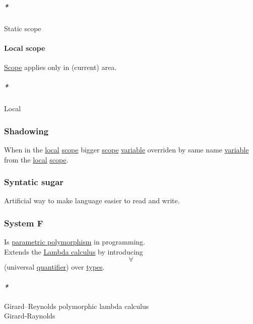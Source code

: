 \documentclass[11pt]{article}
\begin{document}
\subparagraph{\emph{*}}
\label{sec:org0f3cca0}

\label{orgd10a8be}Static scope\\

\paragraph{\label{org4480acc}Local scope}
\label{sec:org4bb45eb}
\hyperref[orgb3c0d1a]{Scope} applies only in (current) area.\\

\subparagraph{\emph{*}}
\label{sec:org19e1e8d}

\label{orgc8947ec}Local\\

\subsubsection{\label{org80e39bd}Shadowing}
\label{sec:orgdaaa21c}
When in the \hyperref[orgc8947ec]{local} \hyperref[orgb3c0d1a]{scope} bigger \hyperref[orgb3c0d1a]{scope} \hyperref[org0b57594]{variable} overriden by same name \hyperref[org0b57594]{variable} from the \hyperref[orgc8947ec]{local} \hyperref[orgb3c0d1a]{scope}.\\

\subsubsection{\label{org5d11ea2}Syntatic sugar}
\label{sec:org32d5eee}
Artificial way to make language easier to read and write.\\

\subsubsection{\label{org07b0ec5}System F}
\label{sec:orgf15d7e8}
Is \hyperref[org3c0b242]{parametric polymorphism} in programming.\\

Extends the \hyperref[org37da5f9]{Lambda calculus} by introducing $$ \forall $$ (universal \hyperref[org357bc41]{quantifier}) over \hyperref[org4209edd]{types}.\\

\paragraph{\emph{*}}
\label{sec:org6903086}

\label{orgde138ec}Girard–Reynolds polymorphic lambda calculus\\
\label{org8b4e95a}Girard-Raynolds\\
\end{document}
